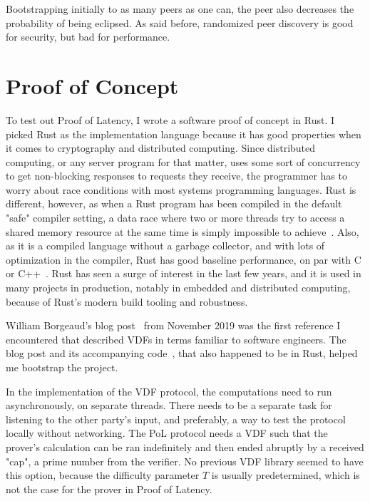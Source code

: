 Bootstrapping initially to as many peers as one can, the peer also decreases the probability of being eclipsed. As said before, randomized peer discovery is good for security, but bad for performance.

\chapter{Proof of Concept}
\label{Proof of Concept}
To test out Proof of Latency, I wrote a software proof of concept in Rust. I picked Rust as the implementation language because it has good properties when it comes to cryptography and distributed computing. Since distributed computing, or any server program for that matter, uses some sort of concurrency to get non-blocking responses to requests they receive, the programmer has to worry about race conditions with most systems programming languages. Rust is different, however, as when a Rust program has been compiled in the default "safe" compiler setting, a data race where two or more threads try to access a shared memory resource at the same time is simply impossible to achieve~\cite{The_Rust_Project_Developers2018-xh}. Also, as it is a compiled language without a garbage collector, and with lots of optimization in the compiler, Rust has good baseline performance, on par with C or C++~\cite{Howarth2020-zc}. Rust has seen a surge of interest in the last few years, and it is used in many projects in production, notably in embedded and distributed computing, because of Rust's modern build tooling and robustness.

William Borgeaud's blog post~\cite{Borgeaud2019-wk} from November 2019 was the first reference I encountered that described VDFs in terms familiar to software engineers. The blog post and its accompanying code~\cite{Borgeaud2019-wk}, that also happened to be in Rust, helped me bootstrap the project.

In the implementation of the VDF protocol, the computations need to run asynchronously, on separate threads. There needs to be a separate task for listening to the other party's input, and preferably, a way to test the protocol locally without networking. The PoL protocol needs a VDF such that the prover's calculation can be ran indefinitely and then ended abruptly by a received "cap", a prime number from the verifier. No previous VDF library seemed to have this option, because the difficulty parameter \(T\) is usually predetermined, which is not the case for the prover in Proof of Latency.

